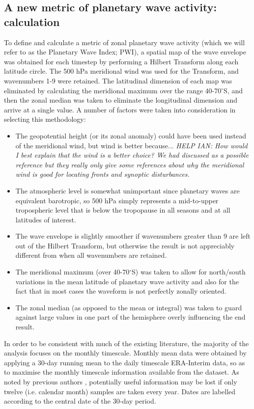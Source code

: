 \subsection{A new metric of planetary wave activity: calculation}

To define and calculate a metric of zonal planetary wave activity (which we will refer to as the Planetary Wave Index; PWI), a spatial map of the wave envelope was obtained for each timestep by performing a Hilbert Transform along each latitude circle. The 500 hPa meridional wind was used for the Transform, and wavenumbers 1-9 were retained. The latitudinal dimension of each map was eliminated by calculating the meridional maximum over the range 40-70$^{\circ}$S, and then the zonal median was taken to eliminate the longitudinal dimension and arrive at a single value. A number of factors were taken into consideration in selecting this methodology:
\begin{itemize}
\item The geopotential height (or its zonal anomaly) could have been used instead of the meridional wind, but wind is better because... \textit{HELP IAN: How would I best explain that the wind is a better choice? We had discussed \citet{Hope2014} as a possible reference but they really only give some references about why the meridional wind is good for locating fronts and synoptic disturbances.}
\item The atmospheric level is somewhat unimportant since planetary waves are equivalent barotropic, so 500 hPa simply represents a mid-to-upper tropospheric level that is below the tropopause in all seasons and at all latitudes of interest.
\item The wave envelope is slightly smoother if wavenumbers greater than 9 are left out of the Hilbert Transform, but otherwise the result is not appreciably different from when all wavenumbers are retained.
\item The meridional maximum (over 40-70$^{\circ}$S) was taken to allow for north/south variations in the mean latitude of planetary wave activity and also for the fact that in most cases the waveform is not perfectly zonally oriented. 
\item The zonal median (as opposed to the mean or integral) was taken to guard against large values in one part of the hemisphere overly influencing the end result.
\end{itemize}

In order to be consistent with much of the existing literature, the majority of the analysis focuses on the monthly timescale. Monthly mean data were obtained by applying a 30-day running mean to the daily timescale ERA-Interim data, so as to maximise the monthly timescale information available from the dataset. As noted by previous authors \citep[e.g.][]{Kidson1988}, potentially useful information may be lost if only twelve (i.e. calendar month) samples are taken every year. Dates are labelled according to the central date of the 30-day period.   